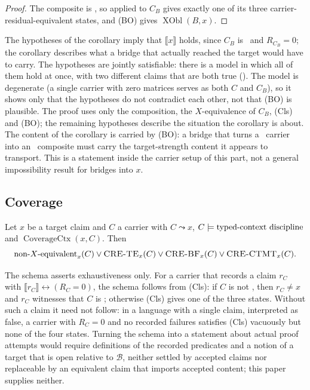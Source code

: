 \begin{proof}
The composite is \Xequiv, so  applied to
\(C_{B}\) gives exactly one of its three carrier-residual-equivalent
states, and (BO) gives \(\operatorname{XObl}(B,x)\).
\end{proof}

The hypotheses of the corollary imply that \(\llbracket x\rrbracket\)
holds, since \(C_{B}\) is \Xequiv\ and \(R_{C_{B}}=0\); the corollary
describes what a bridge that actually reached the target would have to
carry.  The hypotheses are jointly satisfiable: there is a model in
which all of them hold at once, with two different claims that are both
true ().  The model is degenerate (a
single carrier with zero matrices serves as both \(C\) and \(C_{B}\)),
so it shows only that the hypotheses do not contradict each other, not
that (BO) is plausible.  The proof uses only the
composition, the \(X\)-equivalence of \(C_{B}\), (Cls) and (BO); the
remaining hypotheses describe the situation the corollary is about.  The content of the corollary is
carried by (BO): a bridge that turns a \nonXequiv\ carrier into an
\Xequiv\ composite must carry the target-strength content it appears to
transport.  This is a statement inside the carrier setup of this part,
not a general impossibility result for bridges into \(x\).

\subsection{Coverage}\label{sec:foreclosure:coverage}

\begin{schema}\label{thm:coverage}
Let \(x\) be a target claim and \(C\) a carrier with \(C\leadsto x\),
\(C\models\text{typed-context discipline}\) and \(\operatorname{CoverageCtx}(x,C)\).  Then
\[
  \mbox{non-$X$-equivalent}_{x}(C)\vee
  \mbox{\textup{\textsc{CRE-TE}}}_{x}(C)\vee
  \mbox{\textup{\textsc{CRE-BF}}}_{x}(C)\vee
  \mbox{\textup{\textsc{CRE-CTMT}}}_{x}(C).
\]
\end{schema}

The schema asserts exhaustiveness only.  For a carrier that records a
claim \(r_{C}\) with \(\llbracket r_{C}\rrbracket\leftrightarrow(R_{C}=0)\),
the schema follows from (Cls): if \(C\) is not \Xequiv, then
\(r_{C}\neq x\) and \(r_{C}\) witnesses that \(C\) is \nonXequiv;
otherwise (Cls) gives one of the three states.  Without such a claim it
need not follow: in a language with a single claim, interpreted as
false, a carrier with \(R_{C}=0\) and no recorded failures satisfies
(Cls) vacuously but none of the four states.  Turning the schema into
a statement about actual proof attempts would require definitions of
the recorded predicates and a notion of a target that is open relative
to \(\mathcal B\), neither settled by accepted claims nor replaceable by
an equivalent claim that imports accepted content; this paper supplies
neither.

